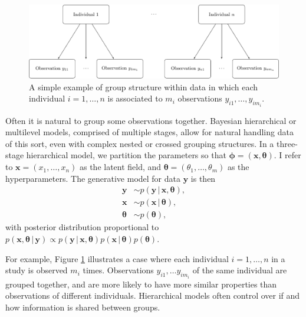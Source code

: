 \documentclass[a4paper, nobind]{templates/ociamthesis}
\begin{document}
\begin{figure}

{\centering \includegraphics[width=0.95\linewidth]{figures/bayesian/hierarchical-structure} 

}

\caption{A simple example of group structure within data in which each individual \(i = 1, \ldots, n\) is associated to \(m_i\) observations \(y_{i1}, \ldots, y_{im_i}\).}\label{fig:hierarchical-structure}
\end{figure}

Often it is natural to group some observations together.
Bayesian hierarchical or multilevel models, comprised of multiple stages, allow for natural handling data of this sort, even with complex nested or crossed grouping structures.
In a three-stage hierarchical model, we partition the parameters so that \(\boldsymbol{\mathbf{\phi}} = (\mathbf{x}, \boldsymbol{\mathbf{\theta}})\).
I refer to \(\mathbf{x} = (x_1, \ldots, x_n)\) as the latent field, and \(\boldsymbol{\mathbf{\theta}} = (\theta_1, \ldots, \theta_m)\) as the hyperparameters.
The generative model for data \(\mathbf{y}\) is then
\begin{align}
\mathbf{y} &\sim p(\mathbf{y} \, | \, \mathbf{x}, \boldsymbol{\mathbf{\theta}}), \\
\mathbf{x} &\sim p(\mathbf{x} \, | \, \boldsymbol{\mathbf{\theta}}), \\
\boldsymbol{\mathbf{\theta}} &\sim p(\boldsymbol{\mathbf{\theta}}),
\end{align}
with posterior distribution proportional to \(p(\mathbf{x}, \boldsymbol{\mathbf{\theta}} \, | \, \mathbf{y}) \propto p(\mathbf{y} \, | \, \mathbf{x}, \boldsymbol{\mathbf{\theta}}) p(\mathbf{x} \, | \, \boldsymbol{\mathbf{\theta}}) p(\boldsymbol{\mathbf{\theta}})\).

For example, Figure \ref{fig:hierarchical-structure} illustrates a case where each individual \(i = 1, \ldots, n\) in a study is observed \(m_i\) times.
Observations \(y_{i1}, \ldots y_{im_i}\) of the same individual are grouped together, and are more likely to have more similar properties than observations of different individuals.
Hierarchical models often control over if and how information is shared between groups.
\end{document}
